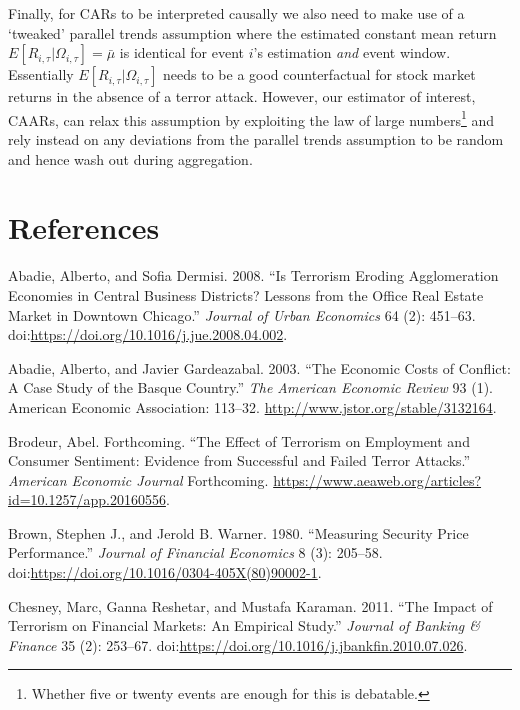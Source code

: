 \documentclass[]{AEA}
\begin{document}
Finally, for CARs to be interpreted causally we also need to make use of
a `tweaked' parallel trends assumption where the estimated constant mean
return \(E[R_{i,\tau}\vert\Omega_{i,\tau}] = \bar{\mu}\) is identical
for event \(i\)'s estimation \textit{and} event window. Essentially
\(E[R_{i,\tau}\vert\Omega_{i,\tau}]\) needs to be a good counterfactual
for stock market returns in the absence of a terror attack. However, our
estimator of interest, CAARs, can relax this assumption by exploiting
the law of large numbers\footnote{Whether five or twenty events are
  enough for this is debatable.} and rely instead on any deviations from
the parallel trends assumption to be random and hence wash out during
aggregation.

\section{References}

\appendix

\hypertarget{refs}{}
\hypertarget{ref-ABADIE2008451}{}
Abadie, Alberto, and Sofia Dermisi. 2008. ``Is Terrorism Eroding
Agglomeration Economies in Central Business Districts? Lessons from the
Office Real Estate Market in Downtown Chicago.'' \emph{Journal of Urban
Economics} 64 (2): 451--63.
doi:\href{https://doi.org/https://doi.org/10.1016/j.jue.2008.04.002}{https://doi.org/10.1016/j.jue.2008.04.002}.

\hypertarget{ref-10.2307ux2f3132164}{}
Abadie, Alberto, and Javier Gardeazabal. 2003. ``The Economic Costs of
Conflict: A Case Study of the Basque Country.'' \emph{The American
Economic Review} 93 (1). American Economic Association: 113--32.
\url{http://www.jstor.org/stable/3132164}.

\hypertarget{ref-B_forthcoming}{}
Brodeur, Abel. Forthcoming. ``The Effect of Terrorism on Employment and
Consumer Sentiment: Evidence from Successful and Failed Terror
Attacks.'' \emph{American Economic Journal} Forthcoming.
\url{https://www.aeaweb.org/articles?id=10.1257/app.20160556}.

\hypertarget{ref-BROWN1980205}{}
Brown, Stephen J., and Jerold B. Warner. 1980. ``Measuring Security
Price Performance.'' \emph{Journal of Financial Economics} 8 (3):
205--58.
doi:\href{https://doi.org/https://doi.org/10.1016/0304-405X(80)90002-1}{https://doi.org/10.1016/0304-405X(80)90002-1}.

\hypertarget{ref-CHESNEY2011253}{}
Chesney, Marc, Ganna Reshetar, and Mustafa Karaman. 2011. ``The Impact
of Terrorism on Financial Markets: An Empirical Study.'' \emph{Journal
of Banking \& Finance} 35 (2): 253--67.
doi:\href{https://doi.org/https://doi.org/10.1016/j.jbankfin.2010.07.026}{https://doi.org/10.1016/j.jbankfin.2010.07.026}.
\end{document}
